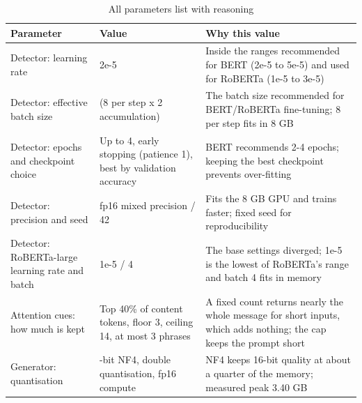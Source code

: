\begin{table}[H]
\centering
\footnotesize
\renewcommand{\arraystretch}{1.1}
\begin{tabularx}{\textwidth}{@{}>{\raggedright\arraybackslash}p{}>{\raggedright\arraybackslash}p{}>{\raggedright\arraybackslash}X@{}}
\toprule
\textbf{Parameter} & \textbf{Value} & \textbf{Why this value} \\
\midrule
Detector: learning rate & 2e-5 & Inside the ranges recommended for BERT (2e-5 to 5e-5) and used for RoBERTa (1e-5 to 3e-5) \\
Detector: effective batch size & 16 (8 per step x 2 accumulation) & The batch size recommended for BERT/RoBERTa fine-tuning; 8 per step fits in 8 GB \\
Detector: epochs and checkpoint choice & Up to 4, early stopping (patience 1), best by validation accuracy & BERT recommends 2-4 epochs; keeping the best checkpoint prevents over-fitting \\
Detector: precision and seed & fp16 mixed precision / 42 & Fits the 8 GB GPU and trains faster; fixed seed for reproducibility \\
Detector: RoBERTa-large learning rate and batch & 1e-5 / 4 & The base settings diverged; 1e-5 is the lowest of RoBERTa's range and batch 4 fits in memory \\
Attention cues: how much is kept & Top 40\% of content tokens, floor 3, ceiling 14, at most 3 phrases & A fixed count returns nearly the whole message for short inputs, which adds nothing; the cap keeps the prompt short \\
Generator: quantisation & 4-bit NF4, double quantisation, fp16 compute & NF4 keeps 16-bit quality at about a quarter of the memory; measured peak 3.40 GB \\
\bottomrule
\end{tabularx}
\caption{All parameters list with reasoning}
\label{tab:4.10}
\end{table}

